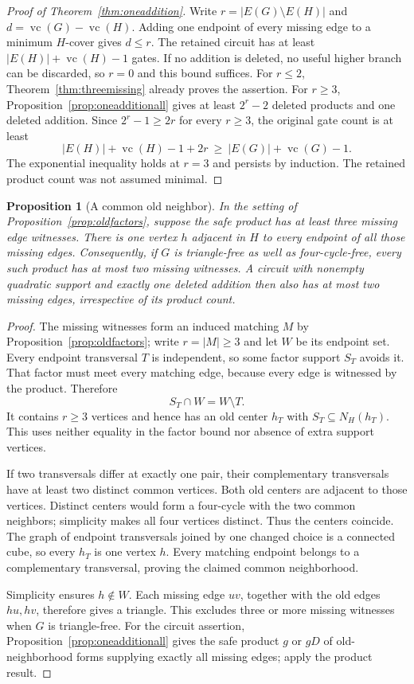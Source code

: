 \documentclass[11pt]{article}
\newcommand{\vc}{\operatorname{vc}}
\newtheorem{proposition}[theorem]{Proposition}
\theoremstyle{definition}
\theoremstyle{remark}
\begin{document}
\begin{proof}[Proof of Theorem~\ref{thm:oneaddition}]
Write $r=|E(G)\setminus E(H)|$ and $d=\vc(G)-\vc(H)$. Adding one endpoint of every missing edge to a minimum $H$-cover gives $d\le r$. The retained circuit has at least $|E(H)|+\vc(H)-1$ gates. If no addition is deleted, no useful higher branch can be discarded, so $r=0$ and this bound suffices. For $r\le2$, Theorem~\ref{thm:threemissing} already proves the assertion. For $r\ge3$, Proposition~\ref{prop:oneadditionall} gives at least $2^r-2$ deleted products and one deleted addition. Since $2^r-1\ge2r$ for every $r\ge3$, the original gate count is at least
\[
 |E(H)|+\vc(H)-1+2r
 \ \ge\ |E(G)|+\vc(G)-1.
\]
The exponential inequality holds at $r=3$ and persists by induction. The retained product count was not assumed minimal.
\end{proof}

\begin{proposition}[A common old neighbor]\label{prop:commonoldcenter}
In the setting of Proposition~\ref{prop:oldfactors}, suppose the safe product has at least three missing edge witnesses. There is one vertex $h$ adjacent in $H$ to every endpoint of all those missing edges. Consequently, if $G$ is triangle-free as well as four-cycle-free, every such product has at most two missing witnesses. A circuit with nonempty quadratic support and exactly one deleted addition then also has at most two missing edges, irrespective of its product count.
\end{proposition}
\begin{proof}
The missing witnesses form an induced matching $M$ by Proposition~\ref{prop:oldfactors}; write $r=|M|\ge3$ and let $W$ be its endpoint set. Every endpoint transversal $T$ is independent, so some factor support $S_T$ avoids it. That factor must meet every matching edge, because every edge is witnessed by the product. Therefore
\[
 S_T\cap W=W\setminus T.
\]
It contains $r\ge3$ vertices and hence has an old center $h_T$ with $S_T\subseteq N_H(h_T)$. This uses neither equality in the factor bound nor absence of extra support vertices.

If two transversals differ at exactly one pair, their complementary transversals have at least two distinct common vertices. Both old centers are adjacent to those vertices. Distinct centers would form a four-cycle with the two common neighbors; simplicity makes all four vertices distinct. Thus the centers coincide. The graph of endpoint transversals joined by one changed choice is a connected cube, so every $h_T$ is one vertex $h$. Every matching endpoint belongs to a complementary transversal, proving the claimed common neighborhood.

Simplicity ensures $h\notin W$. Each missing edge $uv$, together with the old edges $hu,hv$, therefore gives a triangle. This excludes three or more missing witnesses when $G$ is triangle-free. For the circuit assertion, Proposition~\ref{prop:oneadditionall} gives the safe product $g$ or $gD$ of old-neighborhood forms supplying exactly all missing edges; apply the product result.
\end{proof}
\end{document}
